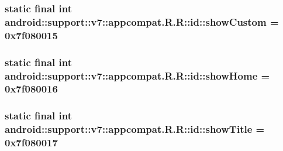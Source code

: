 \hypertarget{classandroid_1_1support_1_1v7_1_1appcompat_1_1_r_1_1id_ed6da2e0de67aa4b036ad3c8acd0d718}{
\subsubsection[{showCustom}]{\setlength{\rightskip}{0pt plus 5cm}static final int android::support::v7::appcompat.R.R::id::showCustom = 0x7f080015}}
\label{classandroid_1_1support_1_1v7_1_1appcompat_1_1_r_1_1id_ed6da2e0de67aa4b036ad3c8acd0d718}


\hypertarget{classandroid_1_1support_1_1v7_1_1appcompat_1_1_r_1_1id_8da4ff84bf26a190fecf465caace6c92}{
\subsubsection[{showHome}]{\setlength{\rightskip}{0pt plus 5cm}static final int android::support::v7::appcompat.R.R::id::showHome = 0x7f080016}}
\label{classandroid_1_1support_1_1v7_1_1appcompat_1_1_r_1_1id_8da4ff84bf26a190fecf465caace6c92}


\hypertarget{classandroid_1_1support_1_1v7_1_1appcompat_1_1_r_1_1id_af22bf28ac6632dc4668abd2339dbcb9}{
\subsubsection[{showTitle}]{\setlength{\rightskip}{0pt plus 5cm}static final int android::support::v7::appcompat.R.R::id::showTitle = 0x7f080017}}
\label{classandroid_1_1support_1_1v7_1_1appcompat_1_1_r_1_1id_af22bf28ac6632dc4668abd2339dbcb9}


